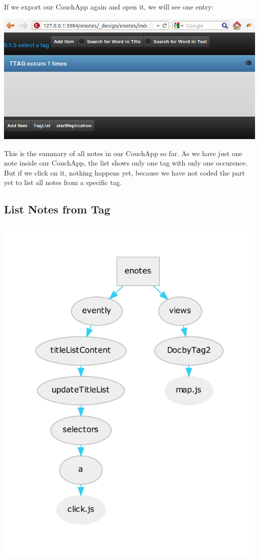 \documentclass[letterpaper,10pt,english]{sphinxmanual}
\begin{document}
If we export our CouchApp again and open it, we will see one entry:

\includegraphics{4_onetag.png}

This is the summary of all notes in our CouchApp so far. As we have just one note inside our CouchApp, the list shows only one tag with only one occurence.
But if we click on it, nothing happens yet, because we have not coded the part yet to list all notes from a specific tag.


\subsection{List Notes from Tag}
\label{4-Logic:list-notes-from-tag}
\includegraphics{graphviz-a6da2fe1a356cc9c333209297f0cc6a1c1cbcdc1.pdf}
\end{document}
